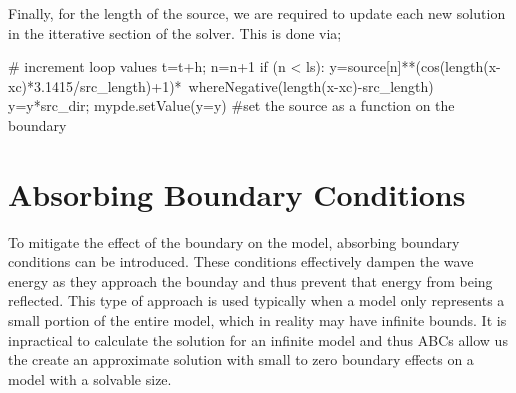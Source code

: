 Finally, for the length of the source, we are required to update each new
solution in the itterative section of the solver. This is done via;
\begin{python}
# increment loop values
t=t+h; n=n+1
if (n < ls):
	y=source[n]**(cos(length(x-xc)*3.1415/src_length)+1)*\
                   whereNegative(length(x-xc)-src_length)
        y=y*src_dir; mypde.setValue(y=y) #set the source as a function on the
boundary
\end{python}

\section{Absorbing Boundary Conditions}
To mitigate the effect of the boundary on the model, absorbing boundary
conditions can be introduced. These conditions effectively dampen the wave
energy as they approach the bounday and thus prevent that energy from being
reflected. This type of approach is used typically when a model only represents
a small portion of the entire model, which in reality may have infinite bounds.
It is inpractical to calculate the solution for an infinite model and thus ABCs
allow us the create an approximate solution with small to zero boundary effects
on a model with a solvable size. 

